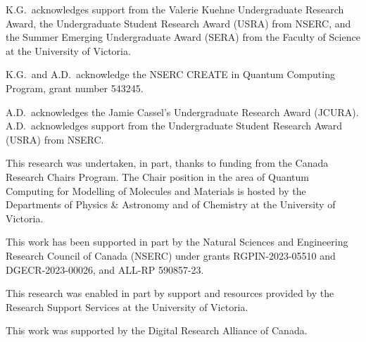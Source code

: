\documentclass{juliacon}
\begin{document}
K.G.~acknowledges support from the Valerie Kuehne Undergraduate Research Award, the Undergraduate Student Research Award (USRA) from NSERC, and the Summer Emerging Undergraduate Award (SERA) from the Faculty of Science at the University of Victoria. 

K.G.~and A.D.~acknowledge the NSERC CREATE in Quantum Computing Program, grant number 543245.

A.D.~acknowledges the Jamie Cassel's Undergraduate Research Award (JCURA). A.D.~acknowledges support from the Undergraduate Student Research Award (USRA) from NSERC.

This research was undertaken, in part, thanks to funding from the Canada Research Chairs Program. The Chair position in the area of Quantum Computing for Modelling of Molecules and Materials is hosted by the Departments of Physics \& Astronomy and of Chemistry at the University of Victoria. 

This work has been supported in part by the Natural Sciences and Engineering Research Council of Canada (NSERC) under grants RGPIN-2023-05510 and DGECR-2023-00026, and ALL-RP 590857-23.

This research was enabled in part by support and resources provided by the Research Support Services at the University of Victoria.

This work was supported by the Digital Research Alliance of Canada.



\end{document}
